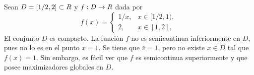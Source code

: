 \begin{example}\label{v1:exa:1.2.2}
    Sean $D = [1/2, 2] \subset R$ y $f : D \to R$ dada por
    \[
        f(x) = \begin{cases}
            1/x, & x \in [1/2, 1), \\
            2, & x \in [1, 2],
        \end{cases}
    \]
    El conjunto $D$ es compacto. La función $f$ no es semicontinua inferiormente en $D$, pues no lo es en el punto $x = 1$. Se tiene que $\bar{v} = 1$, pero no existe $x \in D$ tal que $f(x) = 1$. Sin embargo, es fácil ver que $f$ es semicontinua superiormente y que posee maximizadores globales en $D$.
\end{example}